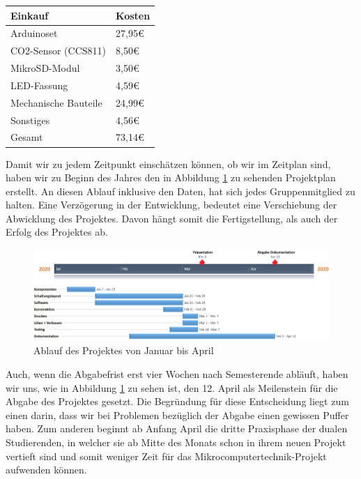 \label{KostenundArbeitsplan}


\begin{table}[!hbt]
	
	\centering
	
	\begin{tabular}{|p{8cm}|p{8cm}|}
		
		\hline
		\rowcolor{lightgray} Einkauf & Kosten \\
		\hline
		Arduinoset & 27,95€ \\
		\hline
		CO2-Sensor (CCS811) & 8,50€ \\
		\hline
		MikroSD-Modul & 3,50€ \\
		\hline
		LED-Fassung & 4,59€ \\
		\hline
		Mechanische Bauteile & 24,99€ \\
		\hline
		Sonstiges & 4,56€ \\
		\hline
		\rowcolor{lightgray} Gesamt & 73,14€ \\
		\hline
		
	\end{tabular}
	
	\label{tab:Kosten}
	
\end{table}

Damit wir zu jedem Zeitpunkt einschätzen können, ob wir im Zeitplan sind, haben wir zu Beginn des Jahres den in Abbildung \ref{fig:Ablaufplan} zu sehenden Projektplan erstellt. An diesen Ablauf inklusive den Daten, hat sich jedes Gruppenmitglied zu halten. Eine Verzögerung in der Entwicklung, bedeutet eine Verschiebung der Abwicklung des Projektes. Davon hängt somit die Fertigstellung, als auch der Erfolg des Projektes ab.

\begin{figure}[!hbt]
	\centering
	\includegraphics[width=1\linewidth]{Images/Ablaufplan}
	\caption{Ablauf des Projektes von Januar bis April}
	\label{fig:Ablaufplan}
\end{figure}

Auch, wenn die Abgabefrist erst vier Wochen nach Semesterende abläuft, haben wir uns, wie in Abbildung \ref{fig:Ablaufplan} zu sehen ist, den 12. April als Meilenstein für die Abgabe des Projektes gesetzt. Die Begründung für diese Entscheidung liegt zum einen darin, dass wir bei Problemen bezüglich der Abgabe einen gewissen Puffer haben. Zum anderen beginnt ab Anfang April die dritte Praxisphase der dualen Studierenden, in welcher sie ab Mitte des Monats schon in ihrem neuen Projekt vertieft sind und somit weniger Zeit für das Mikrocomputertechnik-Projekt aufwenden können.